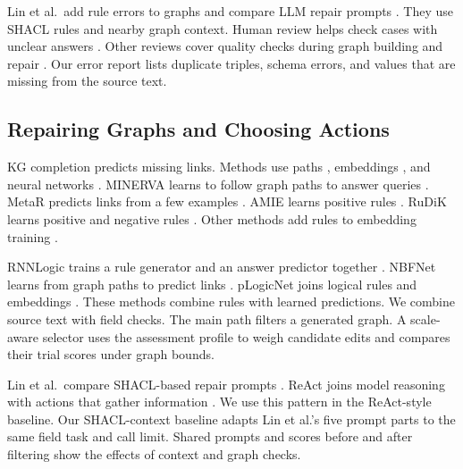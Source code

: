 Lin et al.\ add rule errors to graphs and compare LLM repair prompts
\citep{ref_lin2025}. They use SHACL rules and nearby graph context.
Human review helps check cases with unclear answers \citep{ref_acosta2013}.
Other reviews cover quality checks during graph building and repair
\citep{ref_wang2021,ref_paulheim2017}. Our error report lists duplicate
triples, schema errors, and values that are missing from the source text.

\subsection{Repairing Graphs and Choosing Actions}

KG completion predicts missing links. Methods use paths
\citep{ref_lao2011}, embeddings
\citep{ref_bordes2013,ref_yang2015,ref_shi2017}, and neural networks
\citep{ref_dettmers2018}. MINERVA learns to follow graph paths to answer
queries \citep{ref_das2018}. MetaR predicts links from a few examples
\citep{ref_chen2019}. AMIE learns positive rules \citep{ref_galarraga2013}.
RuDiK learns positive and negative rules \citep{ref_ortona2018}.
Other methods add rules to embedding training
\citep{ref_guo2016,ref_ding2018}.

RNNLogic trains a rule generator and an answer predictor together
\citep{ref_qu2021}. NBFNet learns from graph paths to predict links
\citep{ref_zhu2021}. pLogicNet joins logical rules and embeddings
\citep{ref_qu2019}. These methods combine rules with learned predictions.
We combine source text with field checks.
The main path filters a generated graph.
A scale-aware selector uses the assessment profile to weigh candidate edits
and compares their trial scores under graph bounds.

Lin et al.\ compare SHACL-based repair prompts \citep{ref_lin2025}.
ReAct joins model reasoning with actions that gather information
\citep{ref_yao2023react}. We use this pattern in the ReAct-style baseline.
Our SHACL-context baseline adapts Lin et al.'s five prompt parts to the same
field task and call limit. Shared prompts and scores before and after
filtering show the effects of context and graph checks.
